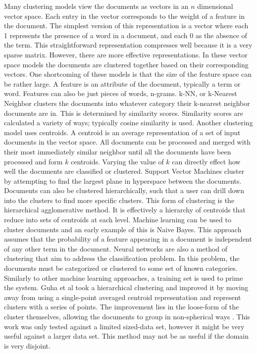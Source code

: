 \documentclass[11pt]{article}
\begin{document}
Many clustering models view the documents as vectors in an $n$ dimensional vector space.
Each entry in the vector corresponds to the weight of a feature in the document.
The simplest version of this representation is a vector where each 1 represents the presence of a word in a document, and each 0 as the absence of the term.
This straightforward representation compresses well because it is a very sparse matrix.
However, there are more effective representations.
In these vector space models the documents are clustered together based on their corresponding vectors.
One shortcoming of these models is that the size of the feature space can be rather large.
A feature is an attribute of the document, typically a term or word.
Features can also be just pieces of words, n-grams.
k-NN, or k-Nearest Neighbor clusters the documents into whatever category their k-nearest neighbor documents are in.
This is determined by similarity scores.
Similarity scores are calculated a variety of ways; typically cosine similarity is used.
Another clustering model uses centroids.
A centroid is an average representation of a set of input documents in the vector space.
All documents can be processed and merged with their most immediately similar neighbor until all the documents have been processed and form $k$ centroids.
Varying the value of $k$ can directly effect how well the documents are classified or clustered.
Support Vector Machines cluster by attempting to find the largest plane in hyperspace between the documents.
Documents can also be clustered hierarchically, such that a user can drill down into the clusters to find more specific clusters.  This form of clustering is the hierarchical agglomerative method.
It is effectively a hierarchy of centroids that reduce into sets of centroids at each level.
Machine learning can be used to cluster documents and an early example of this is Naive Bayes.
This approach assumes that the probability of a feature appearing in a document is independent of any other term in the document.
Neural networks are also a method of clustering that aim to address the classification problem.
In this problem, the documents must be categorized or clustered to some set of known categories.
Similarly to other machine learning approaches, a training set is used to prime the system.
Guha et al took a hierarchical clustering and improved it by moving away from using a single-point averaged centroid representation and represent clusters with a series of points.
The improvement lies in the loose-form of the cluster themselves, allowing the documents to group in non-spherical ways \cite{Guha1998}.
This work was only tested against a limited sized-data set, however it might be very useful against a larger data set.
This method may not be as useful if the domain is very disjoint.
\end{document}
